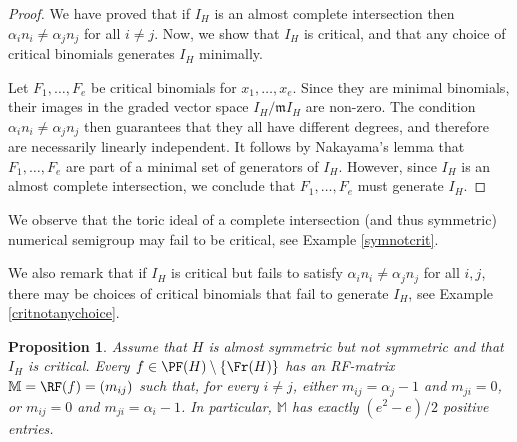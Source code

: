 \documentclass[11pt,twoside]{amsart}
\newcommand{\MM}{\mathbb M}
\def\mm{\mathfrak m}
\def\al{\alpha}
\newtheorem{prop}[Theorem]{Proposition}
\theoremstyle{definition}
\numberwithin{equation}{section}
\begin{document}
\begin{proof}
We have proved that if $I_H$ is an almost complete intersection then 
  $\alpha_i n_i \ne \alpha_j n_j$ for all $i\ne j$. 
Now, we show that $I_H$ is critical, and that any choice of critical binomials generates $I_H$ minimally.

Let $F_1, \ldots, F_e$ be critical  binomials for $x_1, \ldots, x_e$.
Since they are minimal binomials, their images in the graded vector space $I_H/\mm I_H$
are non-zero. 
The condition $\alpha_i n_i \ne \alpha_j n_j$ then guarantees that they all have different degrees, and therefore are necessarily linearly independent.
It follows by Nakayama's lemma that $F_1, \ldots, F_e$ are part of a minimal set of generators of $I_H$.
However, since $I_H$ is an almost complete intersection, we conclude that 
$F_1, \ldots, F_e$ must generate $I_H$.
\end{proof}

We observe that the toric ideal of a complete intersection (and thus symmetric) numerical semigroup may fail to be critical, see Example \ref{symnotcrit}.

We also remark that if $I_H$ is critical but fails to satisfy 
 $\alpha_in_i \ne \alpha_jn_j$ for all $i,j$, there may be choices of critical binomials that fail to generate $I_H$,
see Example \ref{critnotanychoice}.


\begin{prop}\label{mj=alj-1} 
Assume 
that $H$  is almost symmetric but not symmetric and that $I_H$ is critical.
 Every $f \in \PF(H)\setminus\{ \Fr(H)\}$ has
 an RF-matrix   $\MM = \RF(f)= (m_{ij})$ such that, for every  $i\ne j$, 
either $m_{ij} =\al_j -1$ and  $m_{ji} =0$, or $m_{ij} =0$ and $m_{ji} =\al_i -1$. 
In particular,
 $\MM$ has exactly $(e^2 -e)/2$ positive entries.
 \end{prop}
 
\end{document}
